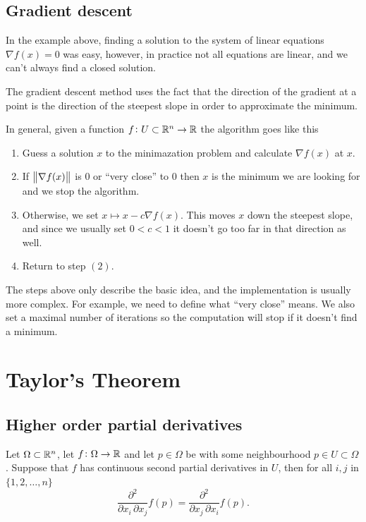 \documentclass[11pt,a4paper]{article}
\begin{document}
\subsection{Gradient descent}
In the example above, finding a solution to the system of linear equations
$\nabla f(x) = 0$ was easy, however, in practice not all equations are linear,
and we can't always find a closed solution.

The gradient descent method uses the fact that the direction of the gradient
at a point is the direction of the steepest slope in order to approximate
the minimum.

In general, given a function $f \colon U \subset \mathbb{R}^n \to \mathbb{R}$ the algorithm
goes like this
\begin{enumerate}
  \item[(1)] Guess a solution $x$ to the minimazation problem and calculate
    $\nabla f(x)$ at $x$.
  \item[(2)] If $\left\lVert\nabla f(x)\right\rVert$ is $0$ or ``very close'' to $0$ then
    $x$ is the minimum we are looking for and we stop the algorithm.
  \item[(3)] Otherwise, we set $x \mapsto x - c \nabla f(x)$.
    This moves $x$ down the steepest slope, and since we usually set
    $0 < c < 1$ it doesn't go too far in that direction as well.
  \item[(4)] Return to step $(2)$.
\end{enumerate}
The steps above only describe the basic idea, and the implementation is usually
more complex.
For example, we need to define what ``very close'' means.
We also set a maximal number of iterations so the computation will stop
if it doesn't find a minimum.


\newpage

\section{Taylor's Theorem}
\subsection{Higher order partial derivatives}
\begin{theorem}
  Let $\Omega \subset \mathbb{R}^n$,
  let $f \colon \Omega \to \mathbb{R}$
  and let $p \in \Omega$ be with some neighbourhood $p \in U \subset \Omega$.
  Suppose that $f$ has continuous
  second partial derivatives in $U$, then for all $i,j$
  in $\{1,2,\dots,n\}$
  \[
    {\frac {\partial ^{2}}{\partial x_{i}\,
    \partial x_{j}}}f({p})={\frac {\partial ^{2}}{\partial x_{j}\,
    \partial x_{i}}}f({p}).
  \]
\end{theorem}
\end{document}
